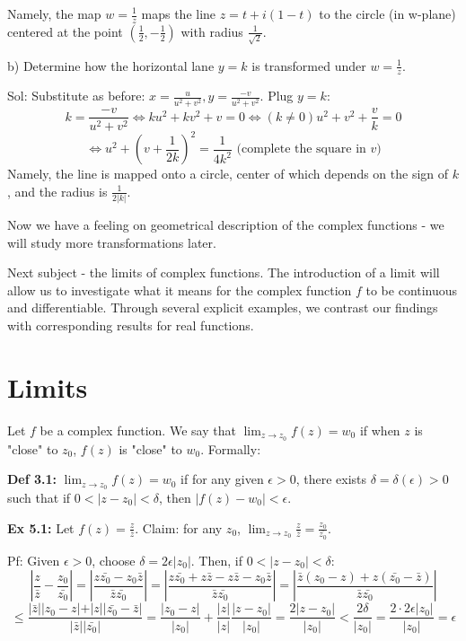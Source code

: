 \documentclass{article}
\begin{document}
Namely, the map $w = \frac{1}{z}$ maps the line $z = t + i(1 - t)$ to the circle (in w-plane) centered at the point $(\frac{1}{2}, -\frac{1}{2})$ with radius $\frac{1}{\sqrt{2}}$.

b) Determine how the horizontal lane $y = k$ is transformed under $w = \frac{1}{z}$.

Sol: Substitute as before: $x = \frac{u}{u^2 + v^2}, y = \frac{-v}{u^2 + v^2}$. Plug $y = k$:
$$k = \frac{-v}{u^2 + v^2} \iff ku^2 + kv^2 + v = 0 \iff (k \neq 0) u^2 + v^2 + \frac{v}{k} = 0$$
$$\iff u^2 + (v + \frac{1}{2k})^2 = \frac{1}{4k^2} \text{ (complete the square in } v)$$
Namely, the line is mapped onto a circle, center of which depends on the sign of $k$, and the radius is $\frac{1}{2\vert k\vert }$.

Now we have a feeling on geometrical description of the complex functions - we will study more transformations later.

Next subject - the limits of complex functions. The introduction of a limit will allow us to investigate what it means for the complex function $f$ to be continuous and differentiable. Through several explicit examples, we contrast our findings with corresponding results for real functions.

\section{Limits}

Let $f$ be a complex function. We say that $\lim_{z \to z_0} f(z) = w_0$ if when $z$ is "close" to $z_0$, $f(z)$ is "close" to $w_0$. Formally:

\textbf{Def 3.1:} $\lim_{z \to z_0} f(z) = w_0$ if for any given $\epsilon > 0$, there exists $\delta = \delta(\epsilon) > 0$ such that if $0 < \vert z - z_0\vert  < \delta$, then $\vert f(z) - w_0\vert  < \epsilon$.

\textbf{Ex 5.1:} Let $f(z) = \frac{z}{\bar{z}}$. Claim: for any $z_0$, $\lim_{z \to z_0} \frac{z}{\bar{z}} = \frac{z_0}{\bar{z_0}}$.

Pf: Given $\epsilon > 0$, choose $\delta = 2\epsilon \vert z_0\vert $. Then, if $0 < \vert z - z_0\vert  < \delta$:
$$\left\vert \frac{z}{\bar{z}} - \frac{z_0}{\bar{z_0}}\right\vert  = \left\vert \frac{z\bar{z_0} - z_0 \bar{z}}{\bar{z}\bar{z_0}}\right\vert  = \left\vert \frac{z\bar{z_0} + z\bar{z} - z\bar{z} - z_0\bar{z}}{\bar{z}\bar{z_0}}\right\vert  = \left\vert \frac{\bar{z}(z_0 - z) + z(\bar{z_0} - \bar{z})}{\bar{z}\bar{z_0}}\right\vert $$
$$\leq \frac{\vert \bar{z}\vert \vert z_0 - z\vert  + \vert z\vert \vert \bar{z_0} - \bar{z}\vert }{\vert \bar{z}\vert \vert \bar{z_0}\vert } = \frac{\vert z_0 - z\vert }{\vert z_0\vert } + \frac{\vert z\vert }{\vert z\vert } \frac{\vert z - z_0\vert }{\vert z_0\vert } = \frac{2\vert z - z_0\vert }{\vert z_0\vert } < \frac{2\delta}{\vert z_0\vert } = \frac{2 \cdot 2\epsilon\vert z_0\vert }{\vert z_0\vert } = \epsilon$$
\end{document}
